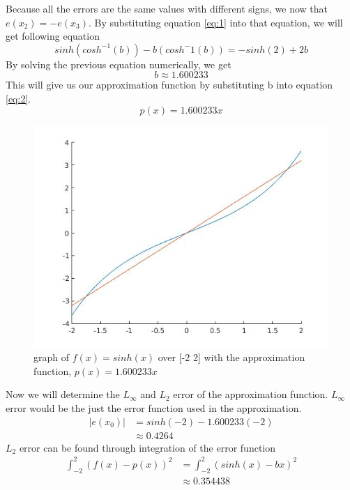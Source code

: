 \documentclass{article}
\begin{document}
Because all the errors are the same values with different signs, we now that $e(x_2) = - e(x_3)$. By substituting equation \ref{eq:1} into that equation, we will get following equation
\begin{equation*}
sinh(cosh^{-1}(b)) - b(cosh^-1(b)) = - sinh(2) + 2b
\end{equation*}
By solving the previous equation numerically, we get
\begin{equation*}
b \approx 1.600233
\end{equation*}
This will give us our approximation function by substituting b into equation \ref{eq:2}.
\begin{equation*}
p(x) = 1.600233x
\end{equation*}
\begin{figure}[H]
\centering
\includegraphics[width=5in]{figures/q1c.jpg}
\caption{graph of $f(x) = sinh(x)$ over [-2 2] with the approximation function, $p(x) = 1.600233x$}
\end{figure}
Now we will determine the $L_\infty$ and $L_2$ error of the approximation function. $L_\infty$ error would be the just the error function used in the approximation.
\begin{equation*}
\begin{aligned}
|e(x_0)| &= sinh(-2) - 1.600233(-2)\\
	&\approx 0.4264
\end{aligned}
\end{equation*}
$L_2$ error can be found through integration of the error function
\begin{equation*}
\begin{aligned}
\int_{-2}^2(f(x) - p(x))^2 &= \int_{-2}^2(sinh(x) - bx)^2\\
							&\approx 0.354438
\end{aligned}
\end{equation*}
\end{document}
